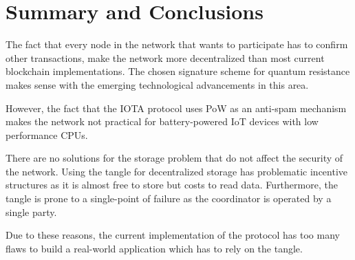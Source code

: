 \chapter{Summary and Conclusions}

The fact that every node in the network that wants to participate has to confirm other transactions, make the network more decentralized than most current blockchain implementations. The chosen signature scheme for quantum resistance makes sense with the emerging technological advancements in this area. 

However, the fact that the IOTA protocol uses PoW as an anti-spam mechanism makes the network not practical for battery-powered IoT devices with low performance CPUs. 

There are no solutions for the storage problem that do not affect the security of the network. Using the tangle for decentralized storage has problematic incentive structures as it is almost free to store but costs to read data. Furthermore, the tangle is prone to a single-point of failure as the coordinator is operated by a single party.

Due to these reasons, the current implementation of the protocol has too many flaws to build a real-world application which has to rely on the tangle. 
